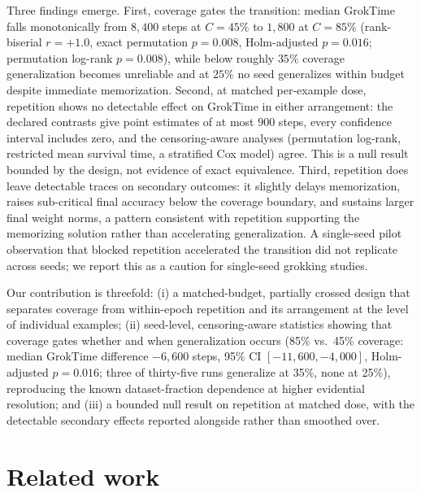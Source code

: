 \documentclass[10pt]{article}
\newcommand{\coverage}{C}
\begin{document}
Three findings emerge. First, coverage gates the transition: median GrokTime falls monotonically from $8{,}400$ steps at $\coverage{=}45\%$ to $1{,}800$ at $\coverage{=}85\%$ (rank-biserial $r=+1.0$, exact permutation $p=0.008$, Holm-adjusted $p=0.016$; permutation log-rank $p=0.008$), while below roughly $35\%$ coverage generalization becomes unreliable and at $25\%$ no seed generalizes within budget despite immediate memorization. Second, at matched per-example dose, repetition shows no detectable effect on GrokTime in either arrangement: the declared contrasts give point estimates of at most $900$ steps, every confidence interval includes zero, and the censoring-aware analyses (permutation log-rank, restricted mean survival time, a stratified Cox model) agree. This is a null result bounded by the design, not evidence of exact equivalence. Third, repetition does leave detectable traces on secondary outcomes: it slightly delays memorization, raises sub-critical final accuracy below the coverage boundary, and sustains larger final weight norms, a pattern consistent with repetition supporting the memorizing solution rather than accelerating generalization. A single-seed pilot observation that blocked repetition accelerated the transition did not replicate across seeds; we report this as a caution for single-seed grokking studies.

Our contribution is threefold: (i) a matched-budget, partially crossed design that separates coverage from within-epoch repetition and its arrangement at the level of individual examples; (ii) seed-level, censoring-aware statistics showing that coverage gates whether and when generalization occurs (85\% vs.\ 45\% coverage: median GrokTime difference $-6{,}600$ steps, 95\% CI $[-11{,}600, -4{,}000]$, Holm-adjusted $p=0.016$; three of thirty-five runs generalize at 35\%, none at 25\%), reproducing the known dataset-fraction dependence at higher evidential resolution; and (iii) a bounded null result on repetition at matched dose, with the detectable secondary effects reported alongside rather than smoothed over.

\section{Related work}
\end{document}
